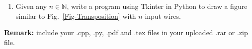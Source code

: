 \documentclass[12pt,a4paper]{article}
\theoremstyle{definition}
\begin{document}
\begin{enumerate}
\begin{enumerate}
\begin{proof}
			So a transposition network with $n$ inputs is a sorting network if and only if it sorts the sequence $\langle n,n-1,...,1\rangle$. Otherwise, the number of inversion pairs of the sequence can not be zero so that the output will not be in order.
        \end{proof}

        \item
        {\color{red}{(Bonus)}} Given any $n \in \mathbb{N}$, write a program using Tkinter in Python to draw a figure similar to Fig.~\ref{Fig-Transposition} with $n$ input wires.
        
    \end{enumerate}

\end{enumerate}

\vspace{20pt}

\textbf{Remark:} include your .cpp, .py, .pdf and .tex files in your uploaded .rar or .zip file.

\end{document}
